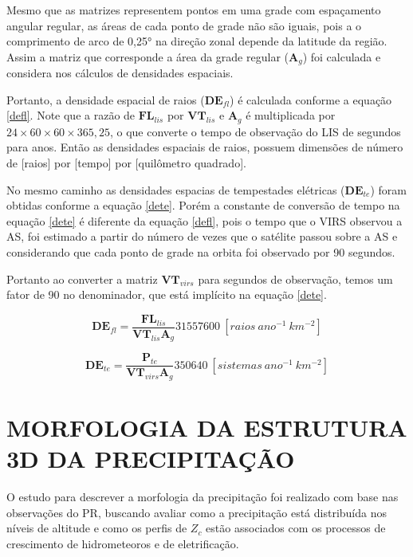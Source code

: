 Mesmo que as matrizes representem pontos em uma grade com espaçamento angular regular, as áreas de cada ponto de grade não são iguais, pois a  o comprimento de arco de 0,25° na direção zonal depende da latitude da região. Assim a matriz que corresponde a área da grade regular ($\mathbf{A}_g$) foi calculada e considera nos cálculos de densidades espaciais.


Portanto, a densidade espacial de raios ($\mathbf{DE}_{fl}$) é calculada conforme a equação \ref{defl}. Note que a razão de $\mathbf{FL}_{lis}$ por $\mathbf{VT}_{lis}$ e $\mathbf{A}_g$ é multiplicada por $24\times60\times60\times365,25$, o que converte o tempo de observação do LIS de segundos para anos. Então as densidades espaciais de raios, possuem dimensões de número de [raios] por [tempo] por [quilômetro quadrado].

No mesmo caminho as densidades espacias de tempestades elétricas ($\mathbf{DE}_{te}$) foram obtidas conforme a equação \ref{dete}. Porém a constante de conversão de tempo na equação \ref{dete} é diferente da equação \ref{defl}, pois o tempo que o VIRS observou a AS, foi estimado a partir do número de vezes que o satélite passou sobre a AS e considerando que cada ponto de grade na orbita foi observado por 90 segundos. 

Portanto ao converter a matriz $\mathbf{VT}_{virs}$ para segundos de observação, temos um fator de 90 no denominador, que está implícito na equação \ref{dete}. 


\begin{equation}
\mathbf{DE}_{fl} = \frac{\mathbf{FL}_{lis}}{\mathbf{VT}_{lis} \mathbf{A}_g} 31557600 ~[raios~ano^{-1}~km^{-2}]    
\label{defl}
\end{equation}

\begin{equation}
\mathbf{DE}_{te} = \frac{\mathbf{P}_{te}}{\mathbf{VT}_{virs} \mathbf{A}_g} 350640 ~[sistemas~ano^{-1}~km^{-2}]    
\label{dete}
\end{equation}

\section{MORFOLOGIA DA ESTRUTURA 3D DA PRECIPITAÇÃO}


O estudo para descrever a morfologia da precipitação foi realizado com base nas observações do PR, buscando avaliar como a precipitação está distribuída nos níveis de altitude e como os perfis de $Z_c$ estão associados com os processos de crescimento de hidrometeoros e de eletrificação.  

